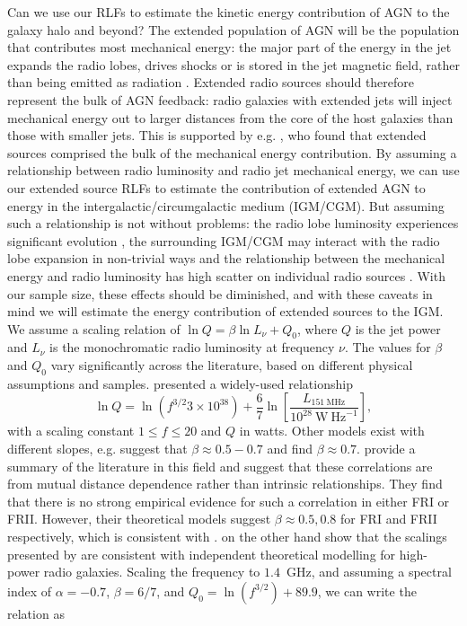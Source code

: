       Can we use our RLFs to estimate the kinetic energy contribution of AGN to the galaxy halo and beyond? The extended population of AGN will be the population that contributes most mechanical energy: the major part of the energy in the jet expands the radio lobes, drives shocks or is stored in the jet magnetic field, rather than being emitted as radiation \citep{godfrey16power, hardcastle14lobes}. Extended radio sources should therefore represent the bulk of AGN feedback: radio galaxies with extended jets will inject mechanical energy out to larger distances from the core of the host galaxies than those with smaller jets. This is supported by e.g. \citet{turner15agn}, who found that extended sources comprised the bulk of the mechanical energy contribution. By assuming a relationship between radio luminosity and radio jet mechanical energy, we can use our extended source RLFs to estimate the contribution of extended AGN to energy in the intergalactic/circumgalactic medium (IGM/CGM). But assuming such a relationship is not without problems: the radio lobe luminosity experiences significant evolution \citep[e.g.][]{bicknell97css}, the surrounding IGM/CGM may interact with the radio lobe expansion in non-trivial ways \citep[e.g.][]{hardcastle13lobes} and the relationship between the mechanical energy and radio luminosity has high scatter on individual radio sources \citep{hardcastle13lobes}. With our sample size, these effects should be diminished, and with these caveats in mind we will estimate the energy contribution of extended sources to the IGM. We assume a scaling relation of $\ln Q = \beta \ln L_\nu + Q_0$, where $Q$ is the jet power and $L_\nu$ is the monochromatic radio luminosity at frequency $\nu$. The values for $\beta$ and $Q_0$ vary significantly across the literature, based on different physical assumptions and samples. \citet{willott99radio} presented a widely-used relationship
      \begin{equation}
        \ln Q = \ln (f^{3/2} 3 \times 10^{38}) + \frac{6}{7} \ln \left[\frac{L_{151~\mathrm{MHz}}}{10^{28}~\mathrm{W\ Hz}^{-1}}\right],
      \end{equation}
      with a scaling constant $1 \leq f \leq 20$ and $Q$ in watts. Other models exist with different slopes, e.g. \citet{birzan08power} suggest that $\beta \approx 0.5 - 0.7$ and \citet{cavagnolo10relation} find $\beta \approx 0.7$. \citet{godfrey16power} provide a summary of the literature in this field and suggest that these correlations are from mutual distance dependence rather than intrinsic relationships. They find that there is no strong empirical evidence for such a correlation in either FRI or FRII. However, their theoretical models suggest $\beta \approx 0.5,0.8$ for FRI and FRII respectively, which is consistent with \citet{willott99radio}. \citet{shabala13power} on the other hand show that the scalings presented by \citet{willott99radio} are consistent with independent theoretical modelling for high-power radio galaxies. Scaling the frequency to $1.4$~GHz, and assuming a spectral index of $\alpha = -0.7$, $\beta = 6/7$, and $Q_0 = \ln (f^{3/2}) + 89.9$, we can write the \citet{willott99radio} relation as
